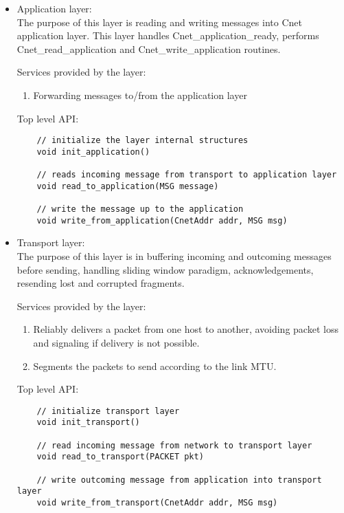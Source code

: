 \documentclass{article}
\begin{document}
\begin{itemize}
  \item Application layer: \\
		The purpose of this layer is reading and writing messages into Cnet
		application layer. This layer handles Cnet\_application\_ready, performs
		Cnet\_read\_application and Cnet\_write\_application routines.
		
		Services provided by the layer:
		\begin{enumerate}
		  \item Forwarding messages to/from the application layer 
		\end{enumerate}
	
	Top level API:
	\begin{verbatim}
    // initialize the layer internal structures
    void init_application()
		
    // reads incoming message from transport to application layer
    void read_to_application(MSG message) 
    
    // write the message up to the application
    void write_from_application(CnetAddr addr, MSG msg)    
	\end{verbatim}
		
\item	Transport layer: \\
		The purpose of this layer is in buffering incoming and outcoming messages
		before sending, handling sliding window paradigm, acknowledgements, resending
		lost and corrupted fragments.
		
		Services provided by the layer:
    \begin{enumerate}
      \item Reliably delivers a packet from one host to another, avoiding packet
      loss and signaling if delivery is not possible.
      \item Segments the packets to send according to the link MTU.
    \end{enumerate}
		
		Top level API:
  \begin{verbatim}
    // initialize transport layer
    void init_transport()
		
    // read incoming message from network to transport layer
    void read_to_transport(PACKET pkt)
    
    // write outcoming message from application into transport layer
    void write_from_transport(CnetAddr addr, MSG msg) 
  \end{verbatim}
		

\end{itemize}
\end{document}
